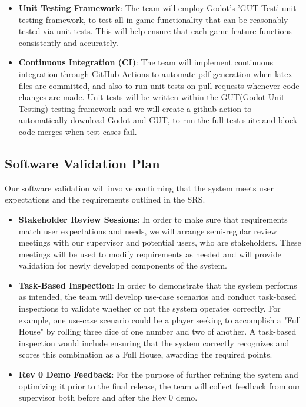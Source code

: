 \documentclass[12pt, titlepage]{article}
\begin{document}
  \begin{itemize}
    \item \textbf{Unit Testing Framework}: The team will employ Godot's 'GUT Test' unit testing framework, to test all in-game functionality that can be reasonably tested via unit tests. This will help ensure that each game feature functions consistently and accurately.
    \item \textbf{Continuous Integration (CI)}: The team will implement continuous integration through GitHub Actions to automate pdf generation when latex files are committed, and also to run unit tests on pull requests whenever code changes are made. Unit tests will be written within the GUT(Godot Unit Testing) testing framework and we will create a github action to automatically download Godot and GUT, to run the full test suite and block code merges when test cases fail.
  \end{itemize}

\subsection{Software Validation Plan}

\noindent Our software validation will involve confirming that the system meets user expectations and the requirements outlined in the SRS.

\begin{itemize}
  \item \textbf{Stakeholder Review Sessions}: In order to make sure that requirements match user expectations and needs, we will arrange semi-regular review meetings with our supervisor and potential users, who are stakeholders. These meetings will be used to modify requirements as needed and will provide validation for newly developed components of the system.
  \item \textbf{Task-Based Inspection}: In order to demonstrate that the system performs as intended, the team will develop use-case scenarios and conduct task-based inspections to validate whether or not the system operates correctly. For example, one use-case scenario could be a player seeking to accomplish a "Full House" by rolling three dice of one number and two of another. A task-based inspection would include ensuring that the system correctly recognizes and scores this combination as a Full House, awarding the required points.
  \item \textbf{Rev 0 Demo Feedback}: For the purpose of further refining the system and optimizing it prior to the final release, the team will collect feedback from our supervisor both before and after the Rev 0 demo. 
\end{itemize}
\end{document}
